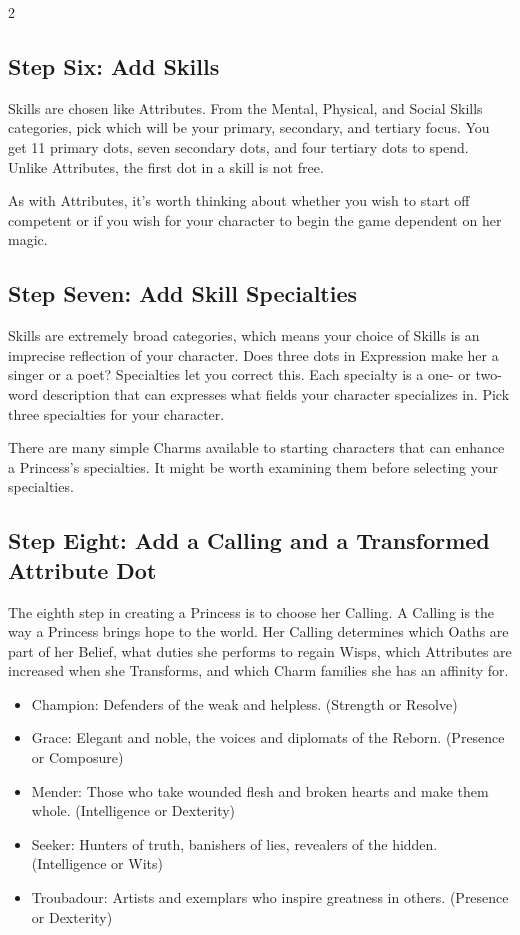 \begin{multicols}{2}
\subsection*{Step Six: Add Skills}

Skills are chosen like Attributes. From the Mental, Physical, and Social Skills categories, pick which will be your primary, secondary, and tertiary focus. You get 11 primary dots, seven secondary dots, and four tertiary dots to spend. Unlike Attributes, the first dot in a skill is not free. 

As with Attributes, it's worth thinking about whether you wish to start off competent or if you wish for your character to begin the game dependent on her magic. 

\subsection*{Step Seven: Add Skill Specialties}
 
Skills are extremely broad categories, which means your choice of Skills is an imprecise reflection of your character. Does three dots in Expression make her a singer or a poet? Specialties let you correct this. Each specialty is a one- or two-word description that can expresses what fields your character specializes in. Pick three specialties for your character. 
 
There are many simple Charms available to starting characters that can enhance a Princess's specialties. It might be worth examining them before selecting your specialties.

\subsection*{Step Eight: Add a Calling and a Transformed Attribute Dot}

The eighth step in creating a Princess is to choose her Calling. A Calling is the way a Princess brings hope to the world. Her Calling determines which Oaths are part of her Belief, what duties she performs to regain Wisps, which Attributes are increased when she Transforms, and which Charm families she has an affinity for.

\begin{itemize}
\item Champion: Defenders of the weak and helpless. (Strength or Resolve)
\item Grace: Elegant and noble, the voices and diplomats of the Reborn. (Presence or Composure) 
\item Mender: Those who take wounded flesh and broken hearts and make them whole. (Intelligence or Dexterity)
\item Seeker: Hunters of truth, banishers of lies, revealers of the hidden. (Intelligence or Wits)
\item Troubadour: Artists and exemplars who inspire greatness in others. (Presence or Dexterity)
\end{itemize}


\end{multicols}
